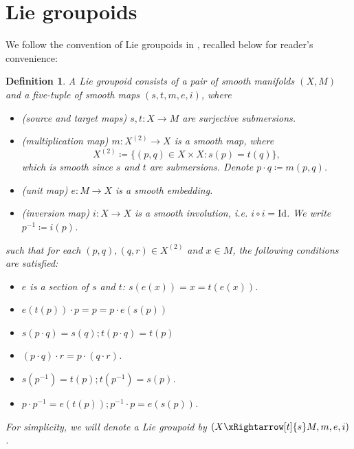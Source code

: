 \documentclass{amsart}
\newtheorem{defn}[theorem]{Definition}
\numberwithin{equation}{section}
\newcommand{\Id}{\mathrm{Id}}
\begin{document}
\section{Lie groupoids}\label{appendix:liegroupoid}
We follow the convention of Lie groupoids in \cite{CFM}, recalled below for reader's convenience:
\begin{defn} \cite[Definition 13.1]{CFM} \label{liegroupoid}
A Lie groupoid consists of a pair of smooth manifolds $(X, M)$ and a five-tuple of smooth maps $(s,t, m, e, i)$, where 
\begin{itemize}
\item (source and target maps) $s,t: X \rightarrow M$ are surjective submersions.
\item (multiplication map) $m: X^{(2)} \rightarrow X$ is a smooth map, where 
$$ X^{(2)} \coloneqq \{(p,q) \in X \times X: s(p) = t(q)\},$$
which is smooth since $s$ and $t$ are submersions. Denote $p\cdot q \coloneqq m(p,q)$.
\item (unit map) $e: M \rightarrow X$ is a smooth embedding.
\item (inversion map) $i: X \rightarrow X$ is a smooth involution, i.e. $i\circ i=\Id$. We write $p^{-1} \coloneqq i(p)$.
\end{itemize}
such that for each $(p,q),(q,r) \in X^{(2)}$ and $x\in M$, the following conditions are satisfied:
\begin{itemize}
\item $e$ is a section of $s$ and $t$: $s(e(x)) = x = t(e(x))$.
\item $e(t(p)) \cdot p  = p =  p \cdot e(s(p)) $
\item $s(p \cdot q) = s(q) ;  t(p \cdot q) =t(p)$
\item $(p \cdot q) \cdot r = p \cdot (q \cdot r)$.
\item $s(p^{-1}) = t(p) ; t(p^{-1}) = s(p)$.
\item $p \cdot p^{-1} = e(t(p)); p^{-1} \cdot p = e(s(p))$.
 
\end{itemize}
For simplicity, we will denote a Lie groupoid by $(X \xRightarrow[t]{s} M, m, e, i)$.\\
\end{defn}




	
\end{document}
